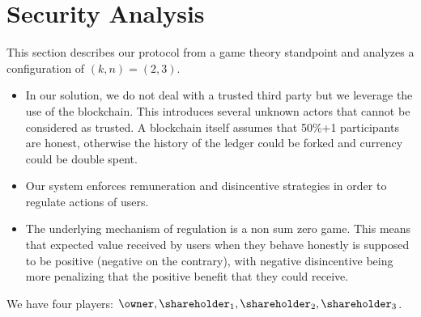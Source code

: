 \section{Security Analysis}\label{sect:analysis}

This section describes our protocol from a game theory standpoint and analyzes a configuration of $(k,n) = (2,3)$. 

\begin{itemize}
	\item In our solution, we do not deal with a trusted third party but we leverage the use of the blockchain. This introduces several unknown actors that cannot be considered as trusted. A blockchain itself assumes that 50\%+1 participants are honest, otherwise the history of the ledger could be forked and currency could be double spent.

	\item Our system enforces remuneration and disincentive strategies in order to regulate actions of users.

	\item The underlying mechanism of regulation is a non sum zero game. This means that expected value received by users when they behave honestly is supposed to be positive (negative on the contrary), with negative disincentive being more penalizing that the positive benefit that they could receive.
\end{itemize}

We have four players: $\owner, \shareholder_1, \shareholder_2, \shareholder_3$.
